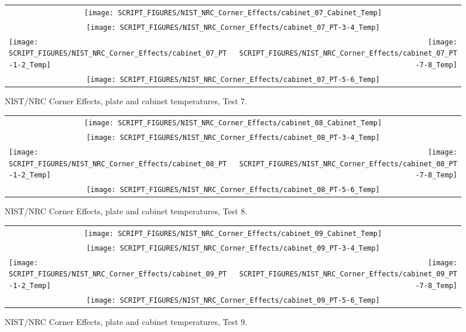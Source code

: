\begin{figure}[p]
\begin{tabular*}{\textwidth}{l@{\extracolsep{\fill}}r}
\multicolumn{2}{c}{\texttt{[image: SCRIPT\_FIGURES/NIST\_NRC\_Corner\_Effects/cabinet\_07\_Cabinet\_Temp]}} \\
\multicolumn{2}{c}{\texttt{[image: SCRIPT\_FIGURES/NIST\_NRC\_Corner\_Effects/cabinet\_07\_PT-3-4\_Temp]}} \\
\texttt{[image: SCRIPT\_FIGURES/NIST\_NRC\_Corner\_Effects/cabinet\_07\_PT-1-2\_Temp]} &
\texttt{[image: SCRIPT\_FIGURES/NIST\_NRC\_Corner\_Effects/cabinet\_07\_PT-7-8\_Temp]} \\
\multicolumn{2}{c}{\texttt{[image: SCRIPT\_FIGURES/NIST\_NRC\_Corner\_Effects/cabinet\_07\_PT-5-6\_Temp]}}
\end{tabular*}
\caption{NIST/NRC Corner Effects, plate and cabinet temperatures, Test 7.}
\label{NIST_NRC_Cabinet_PT_Test_7}
\end{figure}

\begin{figure}[p]
\begin{tabular*}{\textwidth}{l@{\extracolsep{\fill}}r}
\multicolumn{2}{c}{\texttt{[image: SCRIPT\_FIGURES/NIST\_NRC\_Corner\_Effects/cabinet\_08\_Cabinet\_Temp]}} \\
\multicolumn{2}{c}{\texttt{[image: SCRIPT\_FIGURES/NIST\_NRC\_Corner\_Effects/cabinet\_08\_PT-3-4\_Temp]}} \\
\texttt{[image: SCRIPT\_FIGURES/NIST\_NRC\_Corner\_Effects/cabinet\_08\_PT-1-2\_Temp]} &
\texttt{[image: SCRIPT\_FIGURES/NIST\_NRC\_Corner\_Effects/cabinet\_08\_PT-7-8\_Temp]} \\
\multicolumn{2}{c}{\texttt{[image: SCRIPT\_FIGURES/NIST\_NRC\_Corner\_Effects/cabinet\_08\_PT-5-6\_Temp]}}
\end{tabular*}
\caption{NIST/NRC Corner Effects, plate and cabinet temperatures, Test 8.}
\label{NIST_NRC_Cabinet_PT_Test_8}
\end{figure}

\begin{figure}[p]
\begin{tabular*}{\textwidth}{l@{\extracolsep{\fill}}r}
\multicolumn{2}{c}{\texttt{[image: SCRIPT\_FIGURES/NIST\_NRC\_Corner\_Effects/cabinet\_09\_Cabinet\_Temp]}} \\
\multicolumn{2}{c}{\texttt{[image: SCRIPT\_FIGURES/NIST\_NRC\_Corner\_Effects/cabinet\_09\_PT-3-4\_Temp]}} \\
\texttt{[image: SCRIPT\_FIGURES/NIST\_NRC\_Corner\_Effects/cabinet\_09\_PT-1-2\_Temp]} &
\texttt{[image: SCRIPT\_FIGURES/NIST\_NRC\_Corner\_Effects/cabinet\_09\_PT-7-8\_Temp]} \\
\multicolumn{2}{c}{\texttt{[image: SCRIPT\_FIGURES/NIST\_NRC\_Corner\_Effects/cabinet\_09\_PT-5-6\_Temp]}}
\end{tabular*}
\caption{NIST/NRC Corner Effects, plate and cabinet temperatures, Test 9.}
\label{NIST_NRC_Cabinet_PT_Test_9}
\end{figure}


